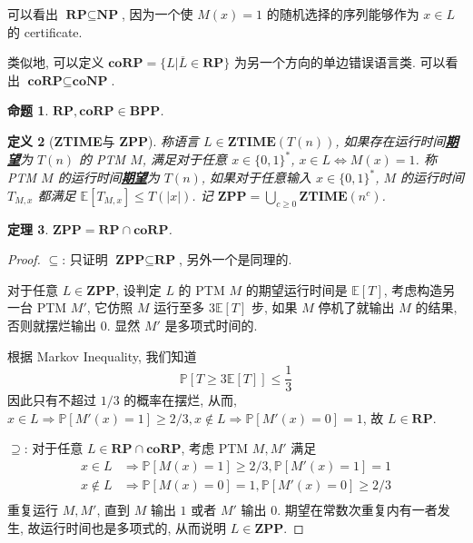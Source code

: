 \documentclass[8pt]{article}
\theoremstyle{compact}
\newtheorem{theorem}{定理}[section]
\newtheorem{definition}[theorem]{定义}
\newtheorem{proposition}[theorem]{命题}
\def\obj#1{\textbf{\uline{#1}}}
\def\le{\leqslant}
\def\ge{\geqslant}
\def\NP{\textbf{NP}}
\def\coNP{\textbf{coNP}}
\def\BPP{\textbf{BPP}}
\def\RP{\textbf{RP}}
\def\coRP{\textbf{coRP}}
\def\ZTIME{\textbf{ZTIME}}
\def\ZPP{\textbf{ZPP}}
\begin{document}
可以看出 $\RP \subseteq \NP$, 因为一个使 $M(x) = 1$ 的随机选择的序列能够作为 $x \in L$ 的 certificate.

类似地, 可以定义 $\coRP = \{L | \overline{L} \in \RP\}$ 为另一个方向的单边错误语言类. 可以看出 $\coRP \subseteq \coNP$.
\begin{proposition}
	$\RP, \coRP \in \BPP$.
\end{proposition}
\begin{definition}[\ZTIME 与 \ZPP]
	称语言 $L \in \ZTIME(T(n))$, 如果存在运行时间\obj{期望}为 $T(n)$ 的 PTM $M$, 满足对于任意 $x \in \{0, 1\}^*$, $x \in L \Leftrightarrow M(x) = 1$. 称 PTM $M$ 的运行时间\obj{期望}为 $T(n)$, 如果对于任意输入 $x \in \{0, 1\}^*$, $M$ 的运行时间 $T_{M, x}$ 都满足 $\mathbb E[T_{M, x}] \le T(|x|)$. 记 $\ZPP = \bigcup_{c \ge 0}\ZTIME(n^c)$.
\end{definition}
\begin{theorem}
	$\ZPP = \RP \cap \coRP$.
\end{theorem}
\begin{proof}
	$\subseteq$: 只证明 $\ZPP \subseteq \RP$, 另外一个是同理的.

	对于任意 $L \in \ZPP$, 设判定 $L$ 的 PTM $M$ 的期望运行时间是 $\mathbb E[T]$, 考虑构造另一台 PTM $M'$, 它仿照 $M$ 运行至多 $3\mathbb E[T]$ 步, 如果 $M$ 停机了就输出 $M$ 的结果, 否则就摆烂输出 $0$. 显然 $M'$ 是多项式时间的.

	根据 Markov Inequality, 我们知道 $$\mathbb P\left[T \ge 3\mathbb E[T]\right] \le \frac{1}{3}$$ 因此只有不超过 $1/3$ 的概率在摆烂, 从而, $x \in L \Rightarrow \mathbb P[M'(x) = 1] \ge 2/3, x \notin L \Rightarrow \mathbb P[M'(x) = 0] = 1$, 故 $L \in \RP$.

	$\supseteq$: 对于任意 $L \in \RP \cap \coRP$, 考虑 PTM $M, M'$ 满足 \begin{equation*}
		\begin{split}
			x \in L &\Rightarrow \mathbb P[M(x) = 1] \ge 2/3, \mathbb P[M'(x) = 1] = 1 \\
			x \notin L &\Rightarrow \mathbb P[M(x) = 0] = 1, \mathbb P[M'(x) = 0] \ge 2/3 \\
		\end{split}
	\end{equation*}
	重复运行 $M, M'$, 直到 $M$ 输出 $1$ 或者 $M'$ 输出 $0$. 期望在常数次重复内有一者发生, 故运行时间也是多项式的, 从而说明 $L \in \ZPP$.
\end{proof}
\end{document}
